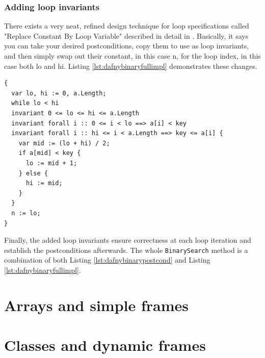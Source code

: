 \documentclass[a4paper]{article}
\begin{document}
\subsubsection{Adding loop invariants}
There exists a very neat, refined design technique
for loop specifications called "Replace Constant By Loop Variable" described in detail in \cite{leino2023program}.
Basically, it says you can take your desired postconditions, copy them to use as loop invariants, and then simply
swap out their constant, in this case n, for the loop index, in this case both lo and hi. Listing
\ref{lst:dafnybinaryfullimpl} demonstrates these changes.
\begin{lstlisting}[style=dafnystyle, caption={Binary search implementation withiout verifier errors.}, label={lst:dafnybinaryfullimpl}]
{
  var lo, hi := 0, a.Length;
  while lo < hi
  invariant 0 <= lo <= hi <= a.Length
  invariant forall i :: 0 <= i < lo ==> a[i] < key
  invariant forall i :: hi <= i < a.Length ==> key <= a[i] {
    var mid := (lo + hi) / 2;
    if a[mid] < key {
      lo := mid + 1;
    } else {
      hi := mid;
    }
  }
  n := lo;
}
\end{lstlisting}
Finally, the added loop invariants ensure correctness at each loop iteration and establish the postconditions
afterwards. The whole \texttt{BinarySearch} method is a combination of both Listing \ref{lst:dafnybinarypostcond}
and Listing \ref{lst:dafnybinaryfullimpl}.

\section{Arrays and simple frames}


\section{Classes and dynamic frames}


\newpage

\listoffigures
\lstlistoflistings


\end{document}
